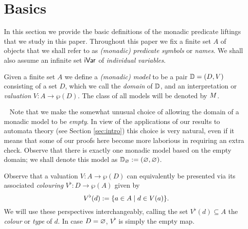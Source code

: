 
\section{Basics}

In this section we provide the basic definitions of the monadic predicate 
liftings that we study in this paper.
Throughout this paper we fix a finite set $A$ of objects that we shall refer to 
as \emph{(monadic) predicate symbols} or \emph{names}.
We shall also assume an infinite set $\mathsf{iVar}$ of \emph{individual variables}.

\begin{definition}
Given a finite set $A$ we define a \emph{(monadic) model} to be a pair
$\mathbb{D} = (D,V )$ consisting of a set $D$,  which we call the \emph{domain} of 
$\mathbb{D}$, and an interpretation or \emph{valuation} $V : A \to \wp (D)$.
The class of all models will be denoted by $\relax{M}$.
\end{definition}

\begin{remark}~
Note that we make the somewhat unusual choice of allowing the domain of a
monadic model to be \emph{empty}.
In view of the applications of our results to automata theory (see 
Section \ref{sec:intro}) this choice is very natural, even if it means that 
some of our proofs here become more laborious in requiring an extra check.
Observe that there is exactly one monadic model based on the empty domain;
we shall denote this model as ${\mathbb{D}_\varnothing} \mathrel{:=} (\varnothing, \varnothing)$. 
\end{remark}

\begin{definition}
Observe that a valuation $V: A \to \wp (D)$ can equivalently be presented via 
its associated \emph{colouring} $V^{\flat}:D \to \wp(A)$ given by
\[
V^{\flat}(d) \mathrel{:=} \{a \in A \mid d \in V(a)\}.
\]
We will use these perspectives interchangeably, calling the set $V^{\flat}(d)
\subseteq A$ the \emph{colour} or \emph{type} of $d$.
In case $D = \varnothing$, $V^{\flat}$ is simply the empty map.
\end{definition}

